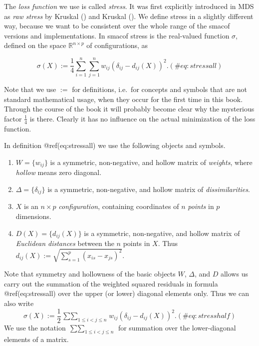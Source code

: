 \documentclass[
  12pt,
  letterpaper,
  DIV=11,
  numbers=noendperiod]{scrartcl}
\providecommand{\tightlist}{%
  \setlength{\itemsep}{0pt}\setlength{\parskip}{0pt}}\usepackage{longtable,booktabs,array}
\begin{document}
The \emph{loss function} we use is called \emph{stress}. It was first
explicitly introduced in MDS as \emph{raw stress} by Kruskal
() and Kruskal
(). We define stress in a slightly
different way, because we want to be consistent over the whole range of
the smacof versions and implementations. In smacof stress is the
real-valued function \(\sigma\), defined on the space
\(\mathbb{R}^{n\times p}\) of configurations, as

\begin{equation}
\sigma(X):=\frac14\sum_{i=1}^n\sum_{j=1}^n w_{ij}(\delta_{ij}-d_{ij}(X))^2.
(\#eq:stressall)
\end{equation}

Note that we use \(:=\) for definitions, i.e.~for concepts and symbols
that are not standard mathematical usage, when they occur for the first
time in this book. Through the course of the book it will probably
become clear why the mysterious factor \(\frac14\) is there. Clearly it
has no influence on the actual minimization of the loss function.

In definition @ref(eq:stressall) we use the following objects and
symbols.

\begin{enumerate}
\def\labelenumi{\arabic{enumi}.}
\tightlist
\item
  \(W=\{w_{ij}\}\) is a symmetric, non-negative, and hollow matrix of
  \emph{weights}, where \emph{hollow} means zero diagonal.
\item
  \(\Delta=\{\delta_{ij}\}\) is a symmetric, non-negative, and hollow
  matrix of \emph{dissimilarities}.
\item
  \(X\) is an \(n\times p\) \emph{configuration}, containing coordinates
  of \(n\) \emph{points} in \(p\) dimensions.
\item
  \(D(X)=\{d_{ij}(X)\}\) is a symmetric, non-negative, and hollow matrix
  of \emph{Euclidean distances} between the \(n\) points in \(X\). Thus
  \(d_{ij}(X):=\sqrt{\sum_{s=1}^p(x_{is}-x_{js})^2}\).
\end{enumerate}

Note that symmetry and hollowness of the basic objects \(W\),
\(\Delta\), and \(D\) allows us carry out the summation of the weighted
squared residuals in formula @ref(eq:stressall) over the upper (or
lower) diagonal elements only. Thus we can also write \begin{equation}
\sigma(X):=\frac12\mathop{\sum\sum}_{1\leq i<j\leq n} w_{ij}(\delta_{ij}-d_{ij}(X))^2.
(\#eq:stresshalf)
\end{equation} We use the notation
\(\mathop{\sum\sum}_{1\leq i<j\leq n}\) for summation over the
lower-diagonal elements of a matrix.
\end{document}
